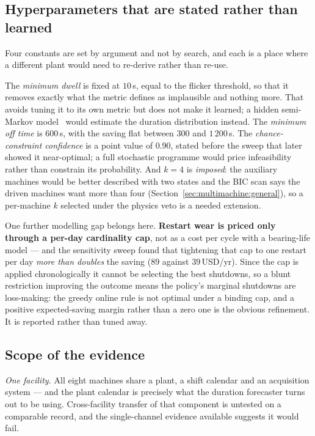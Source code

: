 \subsection{Hyperparameters that are stated rather than learned}
\label{sec:limitations:hyper}

Four constants are set by argument and not by search, and each is a
place where a different plant would need to re-derive rather than
re-use.

The \emph{minimum dwell} is fixed at $10$\,s, equal to the flicker
threshold, so that it removes exactly what the metric defines as
implausible and nothing more. That avoids tuning it to its own metric
but does not make it learned; a hidden semi-Markov
model~\cite{yu2010hsmm} would estimate the duration distribution
instead. The \emph{minimum off time} is $600$\,s, with the saving flat
between $300$ and $1\,200$\,s. The \emph{chance-constraint confidence}
is a point value of $0.90$, stated before the sweep that later showed it
near-optimal; a full stochastic programme would price infeasibility
rather than constrain its probability. And $k=4$ is \emph{imposed}: the
auxiliary machines would be better described with two states and the
BIC scan says the driven machines want more than four
(Section~\ref{sec:multimachine:general}), so a per-machine $k$ selected
under the physics veto is a needed extension.

One further modelling gap belongs here. \textbf{Restart wear is priced
only through a per-day cardinality cap}, not as a cost per cycle with a
bearing-life model --- and the sensitivity sweep found that tightening
that cap to one restart per day \emph{more than doubles} the saving
($89$ against $39$\,USD/yr). Since the cap is applied chronologically it
cannot be selecting the best shutdowns, so a blunt restriction improving
the outcome means the policy's marginal shutdowns are loss-making: the
greedy online rule is not optimal under a binding cap, and a positive
expected-saving margin rather than a zero one is the obvious refinement.
It is reported rather than tuned away.

\subsection{Scope of the evidence}
\label{sec:limitations:scope}

\emph{One facility.} All eight machines share a plant, a shift calendar
and an acquisition system --- and the plant calendar is precisely what
the duration forecaster turns out to be using. Cross-facility transfer
of that component is untested on a comparable record, and the
single-channel evidence available suggests it would fail.

